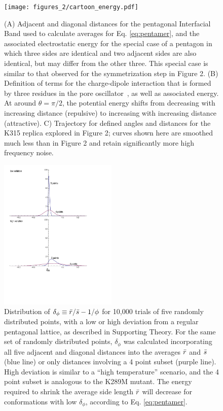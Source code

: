 \documentclass[9pt,onecolumn,oneside,lineno]{pnas-new}
\newcommand{\triad}{pore oscillator~}
\begin{document}
\begin{figure}
\begin{center}
\texttt{[image: figures\_2/cartoon\_energy.pdf]}
\end{center}
\caption{(A) Adjacent and diagonal distances for the pentagonal Interfacial Band used to calculate averages for Eq. \ref{eq:pentamer}, and the associated electrostatic energy for the special case of a pentagon in which three sides are identical and two adjacent sides are also identical, but may differ from the other three.  This special case is similar to that observed for the symmetrization step in Figure 2.  (B) Definition of terms for the charge-dipole interaction that is formed by three residues in the \triad, as well as associated energy. At around $\theta = \pi/2$, the potential energy shifts from decreasing with increasing distance (repulsive) to increasing with increasing distance (attractive).  C) Trajectory for defined angles and distances for the K315 replica explored in Figure 2; curves shown here are smoothed much less than in Figure 2 and retain significantly more high frequency noise. }
\label{fig:cartoon_energy}
\end{figure}

\begin{figure}
\begin{center}
\includegraphics[width = 0.5\textwidth]{figures_2/delta_phi_distribution.pdf}
\end{center}
\caption{Distribution of $\delta_{\phi} \equiv \bar{r}/\bar{s} - 1/\phi$ for 10,000 trials of five randomly distributed points, with a low or high deviation from a regular pentagonal lattice, as described in Supporting Theory. For the same set of randomly distributed points, $\delta_{\phi}$ was calculated incorporating all five adjacent and diagonal distances into the averages $\bar{r}$ and $\bar{s}$ (blue line) or only distances involving a 4 point subset (purple line). High deviation is similar to a ``high temperature'' scenario, and the 4 point subset is analogous to the K289M mutant. The energy required to shrink the average side length $\bar{r}$ will decrease for conformations with low $\delta_{\phi}$, according to Eq. \ref{eq:pentamer}.  }
\label{fig:avgdist}
\end{figure}
\end{document}
